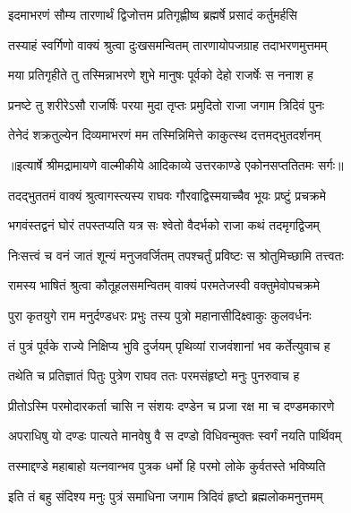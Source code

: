 \twolineshloka
{इदमाभरणं सौम्य तारणार्थं द्विजोत्तम}
{प्रतिगृह्णीष्व ब्रह्मर्षे प्रसादं कर्तुमर्हसि} %

\twolineshloka
{तस्याहं स्वर्गिणो वाक्यं श्रुत्वा दुःखसमन्वितम्}
{तारणायोपजग्राह तदाभरणमुत्तमम्} %

\twolineshloka
{मया प्रतिगृहीते तु तस्मिन्नाभरणे शुभे}
{मानुषः पूर्वको देहो राजर्षेः स ननाश ह} %

\twolineshloka
{प्रनष्टे तु शरीरेऽसौ राजर्षिः परया मुदा}
{तृप्तः प्रमुदितो राजा जगाम त्रिदिवं पुनः} %

\twolineshloka
{तेनेदं शक्रतुल्येन दिव्यमाभरणं मम}
{तस्मिन्निमित्ते काकुत्स्थ दत्तमद्भुतदर्शनम्} %


{॥इत्यार्षे श्रीमद्रामायणे वाल्मीकीये आदिकाव्ये उत्तरकाण्डे एकोनसप्ततितमः सर्गः॥}


\twolineshloka
{तदद्भुततमं वाक्यं श्रुत्वागस्त्यस्य राघवः}
{गौरवाद्विस्मयाच्चैव भूयः प्रष्टुं प्रचक्रमे} %

\twolineshloka
{भगवंस्तद्वनं घोरं तपस्तप्यति यत्र सः}
{श्वेतो वैदर्भको राजा कथं तदमृगद्विजम्} %

\twolineshloka
{निःसत्त्वं च वनं जातं शून्यं मनुजवर्जितम्}
{तपश्चर्तुं प्रविष्टः स श्रोतुमिच्छामि तत्त्वतः} %

\twolineshloka
{रामस्य भाषितं श्रुत्वा कौतूहलसमन्वितम्}
{वाक्यं परमतेजस्वी वक्तुमेवोपचक्रमे} %

\twolineshloka
{पुरा कृतयुगे राम मनुर्दण्डधरः प्रभुः}
{तस्य पुत्रो महानासीदिक्ष्वाकुः कुलवर्धनः} %

\twolineshloka
{तं पुत्रं पूर्वके राज्ये निक्षिप्य भुवि दुर्जयम्}
{पृथिव्यां राजवंशानां भव कर्तेत्युवाच ह} %

\twolineshloka
{तथेति च प्रतिज्ञातं पितुः पुत्रेण राघव}
{ततः परमसंहृष्टो मनुः पुनरुवाच ह} %

\twolineshloka
{प्रीतोऽस्मि परमोदारकर्ता चासि न संशयः}
{दण्डेन च प्रजा रक्ष मा च दण्डमकारणे} %

\twolineshloka
{अपराधिषु यो दण्डः पात्यते मानवेषु वै}
{स दण्डो विधिवन्मुक्तः स्वर्गं नयति पार्थिवम्} %

\twolineshloka
{तस्माद्दण्डे महाबाहो यत्नवान्भव पुत्रक}
{धर्मो हि परमो लोके कुर्वतस्ते भविष्यति} %

\twolineshloka
{इति तं बहु संदिश्य मनुः पुत्रं समाधिना}
{जगाम त्रिदिवं हृष्टो ब्रह्मलोकमनुत्तमम्} %

